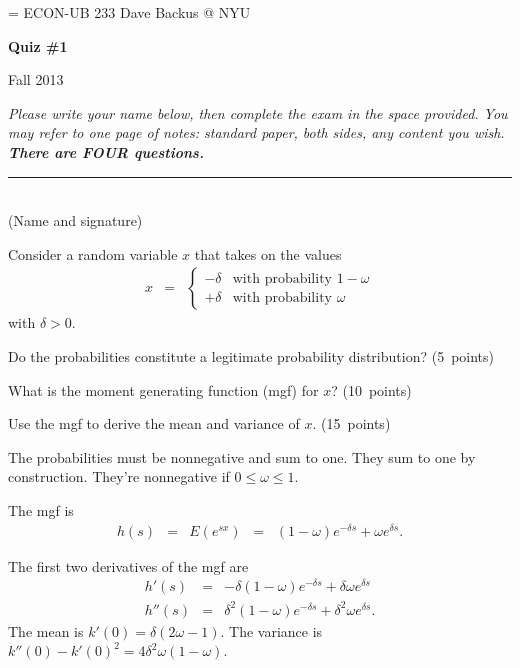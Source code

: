 \documentclass[11pt]{exam}
\begin{document}
\parskip=\bigskipamount
\parindent=0.0in
\thispagestyle{empty}
{\large ECON-UB 233 \hfill Dave Backus @ NYU}

\bigskip\bigskip
\centerline{\Large \bf Quiz \#1}
\centerline{Fall 2013}

\bigskip
{\it Please write your name below,
then complete the exam in the space provided.
You may refer to one page of notes:
standard paper, both sides, any content you wish.
{\bf There are FOUR questions.}
}

\bigskip
\begin{flushleft}
\rule{4in}{0.5pt} \\ (Name and signature)
\end{flushleft}

\begin{questions}
Consider a random variable $x$ that takes on the values
\begin{eqnarray*}
    x &=& \left\{
          \begin{array}{ll}
          - \delta  & \mbox{with probability } 1-\omega \\
          +\delta    & \mbox{with probability } \omega
          \end{array}
          \right.
\end{eqnarray*}
with $\delta > 0$.
%
\begin{parts}
\item Do the probabilities constitute a legitimate probability distribution?
(5~points)
\item What is the moment generating function (mgf) for $x$?
(10~points)
\item Use the mgf to derive the mean and variance of $x$.
(15~points)
\end{parts}

\begin{solution}
\begin{parts}
\item The probabilities must be nonnegative and sum to one.
They sum to one by construction.
They're nonnegative if $ 0 \leq \omega \leq 1$.
\item The mgf is
\begin{eqnarray*}
    h(s) &=& E (e^{sx}) \;\;=\;\;
            (1-\omega) e^{-\delta s} + \omega e^{\delta s} .
\end{eqnarray*}
\item The first two derivatives of the mgf are
\begin{eqnarray*}
    h'(s) &=& - \delta (1-\omega) e^{-\delta s} + \delta \omega e^{\delta s} \\
    h''(s) &=& \delta^2 (1-\omega) e^{-\delta s} + \delta^2 \omega e^{\delta s} .
\end{eqnarray*}
The mean is $k'(0) = \delta(2\omega-1)$.
The variance is
$  k''(0) - k'(0)^2 = 4 \delta^2 \omega(1-\omega)$.
\end{parts}
\end{solution}


\end{questions}
\end{document}
